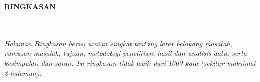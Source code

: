 \clearpage
{}%
\thispagestyle{fancy}

\begin{center}
	\large \bfseries \MakeUppercase{Ringkasan}\\
	\normalsize \normalfont {\thetitle}\\
	\normalsize \normalfont {\theauthor}\\
	\bigskip
	
	\normalsize \normalfont \justifying
	\normalsize \normalfont \justifying
	\textit{Halaman Ringkasan berisi uraian singkat tentang latar belakang masalah, rumusan masalah, tujuan, metodologi penelitian, hasil dan analisis data, serta kesimpulan dan saran. Isi ringkasan tidak lebih dari 1000 kata (sekitar maksimal 2 halaman).}\par
	[Tulis ringkasan di sini.]

	\vfill
	
\end{center}
\clearpage